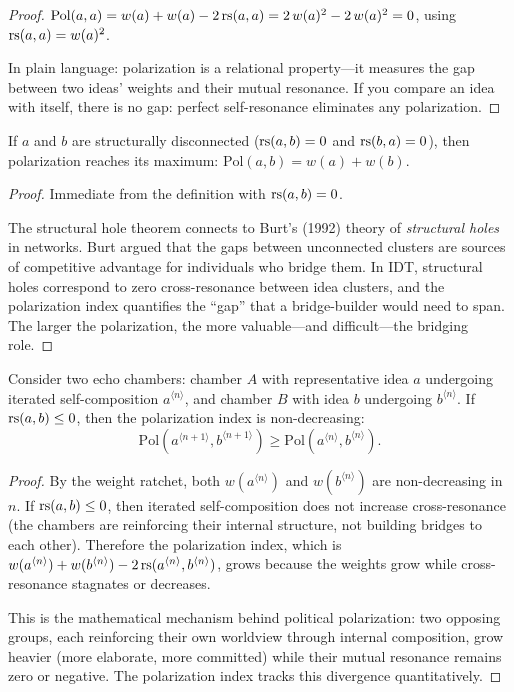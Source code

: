 \begin{proof}
$\text{Pol}(a, a) = w(a) + w(a) - 2\,\mathrm{rs}(a, a) = 2\,w(a)^2 - 2\,w(a)^2 = 0$,
using $\mathrm{rs}(a, a) = w(a)^2$.

In plain language: polarization is a relational property---it measures the
gap between two ideas' weights and their mutual resonance.  If you compare
an idea with itself, there is no gap: perfect self-resonance eliminates
any polarization.
\end{proof}

\begin{theorem}
\label{thm:structural-holes}
If $a$ and $b$ are structurally disconnected ($\mathrm{rs}(a, b) = 0$ and
$\mathrm{rs}(b, a) = 0$), then polarization reaches its maximum:
$\text{Pol}(a, b) = w(a) + w(b)$.
\end{theorem}

\begin{proof}
Immediate from the definition with $\mathrm{rs}(a, b) = 0$.

The structural hole theorem connects to Burt's (1992) theory of
\emph{structural holes} in networks.  Burt argued that the gaps between
unconnected clusters are sources of competitive advantage for individuals
who bridge them.  In IDT, structural holes correspond to zero cross-resonance
between idea clusters, and the polarization index quantifies the ``gap''
that a bridge-builder would need to span.  The larger the polarization,
the more valuable---and difficult---the bridging role.
\end{proof}

\begin{theorem}
\label{thm:polarization-growth}
Consider two echo chambers: chamber $A$ with representative idea $a$
undergoing iterated self-composition $a^{\langle n \rangle}$, and
chamber $B$ with idea $b$ undergoing $b^{\langle n \rangle}$.  If
$\mathrm{rs}(a, b) \leq 0$, then the polarization index is non-decreasing:
\[
  \text{Pol}\!\left(a^{\langle n+1 \rangle}, b^{\langle n+1 \rangle}\right)
  \geq \text{Pol}\!\left(a^{\langle n \rangle}, b^{\langle n \rangle}\right).
\]
\end{theorem}

\begin{proof}
By the weight ratchet, both $w(a^{\langle n \rangle})$ and
$w(b^{\langle n \rangle})$ are non-decreasing in $n$.  If $\mathrm{rs}(a, b) \leq 0$,
then iterated self-composition does not increase cross-resonance (the chambers
are reinforcing their internal structure, not building bridges to each other).
Therefore the polarization index, which is $w(a^{\langle n \rangle}) +
w(b^{\langle n \rangle}) - 2\,\mathrm{rs}(a^{\langle n \rangle}, b^{\langle n \rangle})$,
grows because the weights grow while cross-resonance stagnates or decreases.

This is the mathematical mechanism behind political polarization: two opposing
groups, each reinforcing their own worldview through internal composition,
grow heavier (more elaborate, more committed) while their mutual resonance
remains zero or negative.  The polarization index tracks this divergence
quantitatively.
\end{proof}

